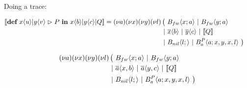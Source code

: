 
Doing a trace:

\begin{align*}
  &\encMJtoAP{\jdef{\jrct{\jrcv{x}{u} \jpat \jrcv{y}{v}}{P}}{\jsnd{x}{b} \jpar \jsnd{y}{c} \jpar Q}}
  = \anew{a}{\anew{x}{\anew{y}{\anew{l}{
      \begin{aligned}[t]
        \big(\ &\ains{B_{fw}}{x}{a}
        \apar   \ains{B_{fw}}{y}{a} \\
        \apar  &\asnd{x}{b} \apar \asnd{y}{c} \apar \encMJtoAP{Q} \\
        \apar  &\ains{B_{nil}}{l}{}
        \apar   \ains{B_a^P}{a}{x, y, x, l}
        \ \big)
      \end{aligned}
    }}}}
\end{align*}


\begin{align*}
  \anew{a}{\anew{x}{\anew{y}{\anew{l}{
    \begin{aligned}[t]
      \big(\ &\ains{B_{fw}}{x}{a}
      \apar   \ains{B_{fw}}{y}{a} \\
      \apar  &\asnd{a}{x,b} \apar \asnd{a}{y,c} \apar \encMJtoAP{Q} \\
      \apar  &\ains{B_{nil}}{l}{}
      \apar   \ains{B_a^P}{a}{x, y, x, l}
      \ \big)
    \end{aligned}
  }}}}
\end{align*}


